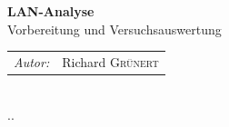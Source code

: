 \documentclass[12pt]{article}
\begin{document}
\begin{titlepage}

{ \huge \bfseries LAN-Analyse}\\ %
\vspace{0.034441853748633004\paperheight}
\large Vorbereitung und Versuchsauswertung\\
\vspace{0.1458980337503154\paperheight}


  \begin{tabular}{lr}
    \emph{Autor:} &
                      Richard {\color{hsblue}\textsc{Grünert}}
   \end{tabular}\\[0.05572809000084118\paperheight]

{\large {\the\day.\the\month.\the\year}}\\




\vfill %

\end{titlepage}
\end{document}
